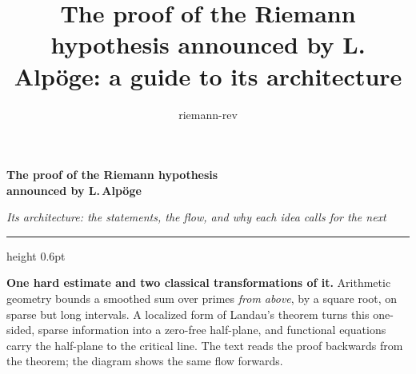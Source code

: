 \documentclass[11pt,a4paper]{article}
\title{The proof of the Riemann hypothesis announced by L. Alpöge: a guide to its architecture}
\author{riemann-rev}
\date{}
\begin{document}
\color{ink}

{\raggedright
{\fontsize{21.5}{25.5}\selectfont\bfseries The proof of the Riemann hypothesis\\ announced by L.\,Alpöge\par}
\vspace{5pt}
{\fontsize{12.4}{16}\selectfont\itshape\color{inksoft} Its architecture: the statements, the flow, and why each idea calls for
the next\par}}
\vspace{8pt}
{\color{rulegrey}\hrule height 0.6pt}
\vspace{7pt}
\thispagestyle{empty}\enlargethispage{12mm}

\textbf{One hard estimate and two classical transformations of it.} Arithmetic geometry bounds a smoothed sum over
primes \emph{from above}, by a square root, on sparse but long intervals. A localized form of Landau's theorem
turns this one-sided, sparse information into a zero-free half-plane, and functional equations carry the half-plane to
the critical line. The text reads the proof backwards from the theorem; the diagram shows the same flow forwards.
\end{document}
